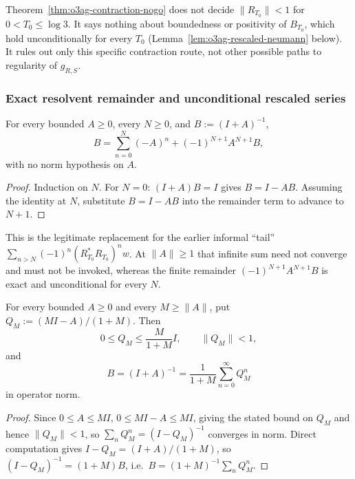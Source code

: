 \begin{remark}[Scope]
Theorem~\ref{thm:o3ag-contraction-nogo} does not decide \(\|R_{T_0}\|<1\) for
\(0<T_0\le\log3\).  It says nothing about boundedness or positivity of \(B_{T_0}\),
which hold unconditionally for every \(T_0\) (Lemma~\ref{lem:o3ag-rescaled-neumann}
below).  It rules out only this specific contraction route, not other possible paths to
regularity of \(g_{R,S}\).
\end{remark}

\subsubsection*{Exact resolvent remainder and unconditional rescaled series}

\begin{lemma}
\label{lem:o3ag-exact-remainder}
For every bounded \(A\ge0\), every \(N\ge0\), and \(B:=(I+A)^{-1}\),
\[
 \boxed{
 B=\sum_{n=0}^N(-A)^n+(-1)^{N+1}A^{N+1}B,
 }
\]
with no norm hypothesis on \(A\).
\end{lemma}

\begin{proof}
Induction on \(N\).  For \(N=0\): \((I+A)B=I\) gives \(B=I-AB\).  Assuming the identity
at \(N\), substitute \(B=I-AB\) into the remainder term to advance to \(N+1\).
\end{proof}

This is the legitimate replacement for the earlier informal ``tail''
\(\sum_{n>N}(-1)^n(R_{T_0}^*R_{T_0})^nw\).  At
\(\|A\|\ge1\) that infinite sum need not converge and must not be invoked, whereas the
finite remainder \((-1)^{N+1}A^{N+1}B\) is exact and unconditional for every \(N\).

\begin{lemma}
\label{lem:o3ag-rescaled-neumann}
For every bounded \(A\ge0\) and every \(M\ge\|A\|\), put
\(Q_M:=(MI-A)/(1+M)\).  Then
\[
 0\le Q_M\le\frac{M}{1+M}I,
 \qquad
 \|Q_M\|<1,
\]
and
\[
 \boxed{
 B=(I+A)^{-1}=\frac1{1+M}\sum_{n=0}^\infty Q_M^n
 }
\]
in operator norm.
\end{lemma}

\begin{proof}
Since \(0\le A\le MI\), \(0\le MI-A\le MI\), giving the stated bound on \(Q_M\) and hence
\(\|Q_M\|<1\), so \(\sum_nQ_M^n=(I-Q_M)^{-1}\) converges in norm.  Direct computation
gives \(I-Q_M=(I+A)/(1+M)\), so \((I-Q_M)^{-1}=(1+M)B\), i.e.\
\(B=(1+M)^{-1}\sum_nQ_M^n\).
\end{proof}

